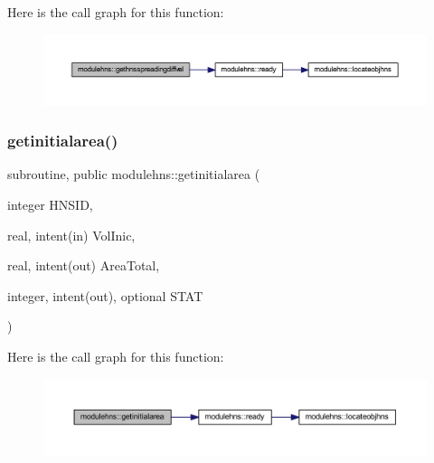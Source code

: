 Here is the call graph for this function\+:\nopagebreak
\begin{figure}[H]
\begin{center}
\leavevmode
\includegraphics[width=350pt]{namespacemodulehns_a13a7fa3be67224e60db06a75d7f0dea7_cgraph}
\end{center}
\end{figure}
\mbox{\label{namespacemodulehns_aabe546b840bff5b9fd03aff072b67385}} 
\subsubsection{\texorpdfstring{getinitialarea()}{getinitialarea()}}
{\footnotesize\ttfamily subroutine, public modulehns\+::getinitialarea (\begin{DoxyParamCaption}\item[{integer}]{H\+N\+S\+ID,  }\item[{real, intent(in)}]{Vol\+Inic,  }\item[{real, intent(out)}]{Area\+Total,  }\item[{integer, intent(out), optional}]{S\+T\+AT }\end{DoxyParamCaption})}

Here is the call graph for this function\+:\nopagebreak
\begin{figure}[H]
\begin{center}
\leavevmode
\includegraphics[width=350pt]{namespacemodulehns_aabe546b840bff5b9fd03aff072b67385_cgraph}
\end{center}
\end{figure}
\mbox{\label{namespacemodulehns_a0b9d738b31afba3668603a21335882f9}} 

